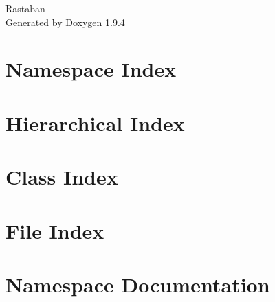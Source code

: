\documentclass[twoside]{book}
\newcommand{\+}{\discretionary{\mbox{\scriptsize$\hookleftarrow$}}{}{}}
\newcommand{\clearemptydoublepage}{%
    \newpage{\pagestyle{empty}\cleardoublepage}%
  }
\begin{document}
  \raggedbottom
    \hypersetup{pageanchor=false,
                bookmarksnumbered=true,
                pdfencoding=unicode
               }
  \begin{titlepage}
  \vspace*{7cm}
  \begin{center}%
  {\Large Rastaban}\\
  \vspace*{1cm}
  {\large Generated by Doxygen 1.9.4}\\
  \end{center}
  \end{titlepage}
  \clearemptydoublepage
  \tableofcontents
  \clearemptydoublepage
  \hypersetup{pageanchor=true}
\chapter{Namespace Index}

\chapter{Hierarchical Index}

\chapter{Class Index}

\chapter{File Index}

\chapter{Namespace Documentation}
























\end{document}
